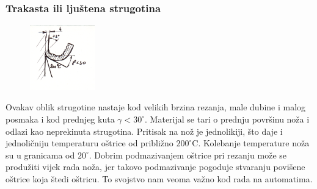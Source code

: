 \documentclass[a4paper,12pt]{article}
\numberwithin{figure}{section}
\begin{document}
\vspace{1cm}
\subsubsection*{Trakasta ili ljuštena strugotina}
\begin{figure}
\centering
\vspace{-0.5cm}
\includegraphics[width=0.25\textwidth]{image_06-1.png}
\end{figure}
\FloatBarrier
Ovakav oblik strugotine nastaje kod velikih brzina rezanja, male dubine i malog posmaka i kod prednjeg kuta $\gamma<30^{\circ}$. Materijal se tari o prednju površinu noža i odlazi kao neprekinuta strugotina. Pritisak na nož je jednolikiji, što daje i jednoličniju temperaturu oštrice od približno $200^{\circ}$C. Kolebanje temperature noža su u granicama od $20^{\circ}$. Dobrim podmazivanjem oštrice pri rezanju može se produžiti vijek rada noža, jer takovo podmazivanje pogoduje stvaranju povišene oštrice koja štedi oštricu. To svojstvo nam veoma važno kod rada na automatima.
\end{document}
